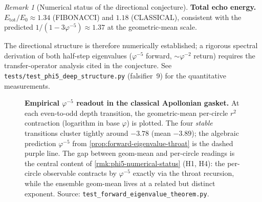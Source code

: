 \documentclass[11pt,a4paper]{article}
\theoremstyle{plain}
\theoremstyle{definition}
\theoremstyle{remark}
\newtheorem{remark}[theorem]{Remark}
\numberwithin{equation}{section}
\newcommand{\vp}{\varphi}
\begin{document}
\begin{remark}[Numerical status of the directional conjecture]
\textbf{Total echo energy.}
\(E_{\mathrm{tot}}/E_0\approx1.34\) (FIBONACCI) and \(1.18\) (CLASSICAL),
consistent with the predicted \(1/(1-3\vp^{-5})\approx1.37\) at the
geometric-mean scale.

The directional structure is therefore numerically established; a
rigorous spectral derivation of both half-step eigenvalues
(\(\vp^{-5}\) forward, \(\sim\vp^{-2}\) return) requires the
transfer-operator analysis cited in the conjecture.
See \texttt{tests/test\_phi5\_deep\_structure.py} (falsifier~9) for the
quantitative measurements.
\end{remark}

\begin{figure}[ht]
\centering
{}
\caption{\textbf{Empirical $\vp^{-5}$ readout in the classical
Apollonian gasket.}
At each even-to-odd depth transition, the geometric-mean per-circle
$r^2$ contraction (logarithm in base $\vp$) is plotted.  The four
\emph{stable} transitions cluster tightly around $-3.78$ (mean
$-3.89$); the algebraic prediction $\vp^{-5}$ from
\cref{prop:forward-eigenvalue-throat} is the dashed purple line.
The gap between geom-mean and per-circle readings is the central
content of \cref{rmk:phi5-numerical-status} (H1, H4): the
per-circle observable contracts by $\vp^{-5}$ exactly via the
throat recursion, while the ensemble geom-mean lives at a
related but distinct exponent.  Source:
\texttt{test\_forward\_eigenvalue\_theorem.py}.}
\label{fig:phi5-empirical}
\end{figure}
\end{document}
